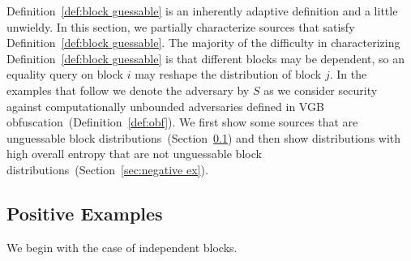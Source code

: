 \documentclass[11pt]{article}
\newcommand{\secref}[1]{\mbox{Section~\ref{#1}}}
\newcommand{\defref}[1]{\mbox{Definition~\ref{#1}}}
\begin{document}
\defref{def:block guessable} is an inherently adaptive definition and a little unwieldy.  In this section, we partially characterize sources that satisfy \defref{def:block guessable}.
The majority of the difficulty in characterizing \defref{def:block guessable} is that different blocks may be dependent, so an equality query on block $i$ may reshape the distribution of block $j$.  In the examples that follow we denote the adversary by $S$ as we consider security against computationally unbounded adversaries defined in VGB obfuscation~(\defref{def:obf}).  We first show some sources that are unguessable block distributions~(\secref{sec:positive ex}) and then show distributions with high overall entropy that are not unguessable block distributions~(\secref{sec:negative ex}).

\subsection{Positive Examples}
\label{sec:positive ex}
We begin with the case of independent blocks.  
\end{document}
